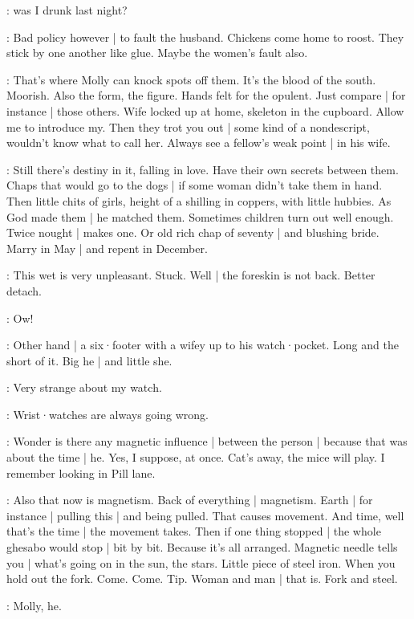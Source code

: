 \BloomOther:
was I drunk last night?

\BloomAbstract:
Bad policy however |
to fault the husband.
Chickens come home to roost.
They stick by one another like glue.
Maybe the women's fault also.

\BloomHist:
That's where Molly can knock spots off them.
It's the blood of the south.
Moorish.
Also the form,
the figure.
Hands felt for the opulent.
Just compare |
for instance |
those others.%
Wife locked up at home,
skeleton in the cupboard.
Allow me to introduce my.
Then they trot you out |
some kind of a nondescript,
wouldn't know what to call her.
Always see a fellow's weak point |
in his wife.

\BloomAbstract:
Still there's destiny in it,
falling in love.
Have their own secrets between them.
Chaps that would go to the dogs |
if some woman didn't take them in hand.
Then little chits of girls,
height of a shilling in coppers,
with little hubbies.
As God made them |
he matched them.
Sometimes children turn out well enough.
Twice nought | makes one.
Or old rich chap of seventy |
and blushing bride.
Marry in May |
and repent in December.

\BloomCurrent:
This wet is very unpleasant.
Stuck.
Well |
the foreskin is not back.
Better detach.%

\BloomInt:
Ow!

\BloomAbstract:
Other hand |
a six·footer with a wifey up to his watch·pocket.
Long and the short of it.
Big he |
and little she.

\BloomToday:
Very strange about my watch.

\BloomAbstract:
Wrist·watches are always going wrong.

\BloomToday:
Wonder is there any magnetic influence |
between the person |
because that was about the time |
he.
Yes,
I suppose,
at once.
Cat's away,
the mice will play.
I remember looking in Pill lane.

\BloomAbstract:
Also that now is magnetism.
Back of everything |
magnetism.
Earth |
for instance |
pulling this |
and being pulled.
That causes movement.
And time,
well that's the time |
the movement takes.
Then if one thing stopped |
the whole ghesabo would stop |
bit by bit.%
Because it's all arranged.
Magnetic needle tells you |
what's going on in the sun,
the stars.
Little piece of steel iron.
When you hold out the fork.
Come.
Come.
Tip.
Woman and man |
that is.
Fork and steel.

\BloomToday:
Molly,
he.

